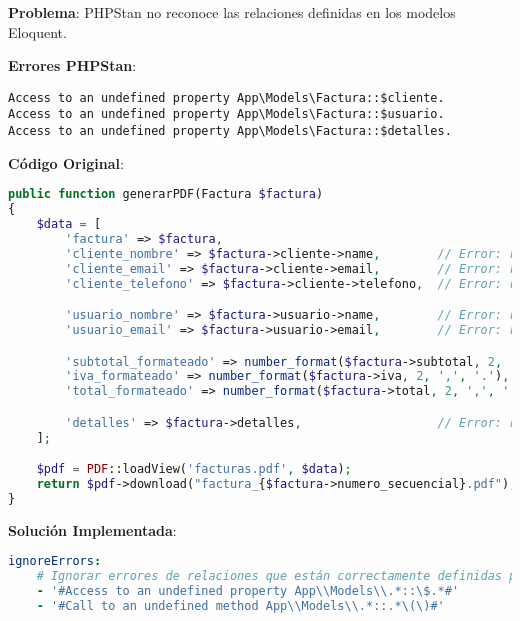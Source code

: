 \documentclass[12pt,a4paper]{article}
\begin{document}
\textbf{Problema}: PHPStan no reconoce las relaciones definidas en los modelos Eloquent.

\textbf{Errores PHPStan}:
\begin{lstlisting}[caption=Errores de relaciones en FacturaController]
Access to an undefined property App\Models\Factura::$cliente.
Access to an undefined property App\Models\Factura::$usuario.
Access to an undefined property App\Models\Factura::$detalles.
\end{lstlisting}

\textbf{Código Original}:
\begin{lstlisting}[language=php, caption=FacturaController.php - Problemas con relaciones]
public function generarPDF(Factura $factura)
{
    $data = [
        'factura' => $factura,
        'cliente_nombre' => $factura->cliente->name,        // Error: relación no detectada
        'cliente_email' => $factura->cliente->email,        // Error: relación no detectada
        'cliente_telefono' => $factura->cliente->telefono,  // Error: relación no detectada

        'usuario_nombre' => $factura->usuario->name,        // Error: relación no detectada
        'usuario_email' => $factura->usuario->email,        // Error: relación no detectada

        'subtotal_formateado' => number_format($factura->subtotal, 2, ',', '.'),
        'iva_formateado' => number_format($factura->iva, 2, ',', '.'),
        'total_formateado' => number_format($factura->total, 2, ',', '.'),

        'detalles' => $factura->detalles,                   // Error: relación no detectada
    ];

    $pdf = PDF::loadView('facturas.pdf', $data);
    return $pdf->download("factura_{$factura->numero_secuencial}.pdf");
}
\end{lstlisting}

\textbf{Solución Implementada}:
\begin{lstlisting}[language=yaml, caption=Ignorado específico para relaciones Eloquent]
ignoreErrors:
    # Ignorar errores de relaciones que están correctamente definidas pero Larastan no detecta
    - '#Access to an undefined property App\\Models\\.*::\$.*#'
    - '#Call to an undefined method App\\Models\\.*::.*\(\)#'
\end{lstlisting}
\end{document}
